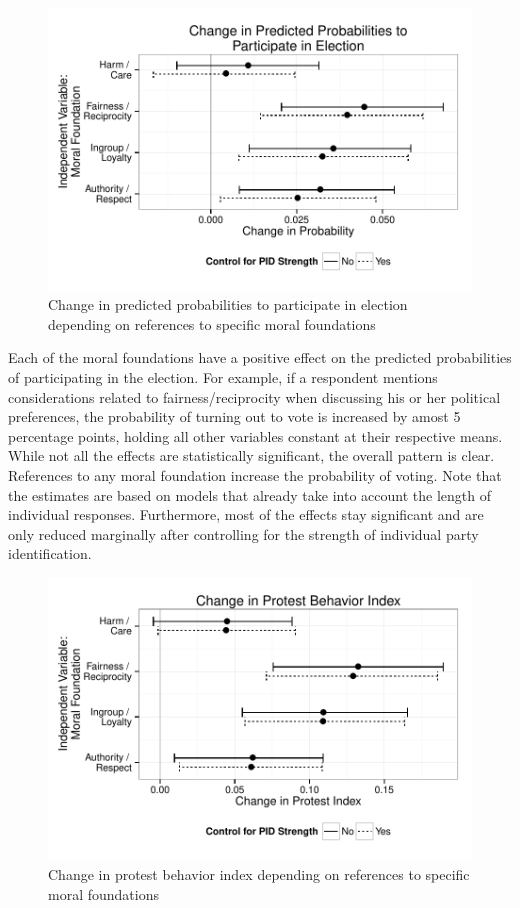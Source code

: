 \documentclass[12pt]{article}
\begin{document}
\begin{figure}[ht]\centering
\includegraphics{../calc/fig/fig5turnout.pdf}
\caption{Change in predicted probabilities to participate in election depending on references to specific moral foundations}\label{fig:5turnout}
\end{figure}

Each of the moral foundations have a positive effect on the predicted probabilities of participating in the election. For example, if a respondent mentions considerations related to fairness/reciprocity when discussing his or her political preferences, the probability of turning out to vote is increased by amost 5 percentage points, holding all other variables constant at their respective means. While not all the effects are statistically significant, the overall pattern is clear. References to any moral foundation increase the probability of voting. Note that the estimates are based on models that already take into account the length of individual responses. Furthermore, most of the effects stay significant and are only reduced marginally after controlling for the strength of individual party identification.

\begin{figure}[ht]\centering
\includegraphics{../calc/fig/fig6part.pdf}
\caption{Change in protest behavior index depending on references to specific moral foundations}\label{fig:6part}
\end{figure}
\end{document}
